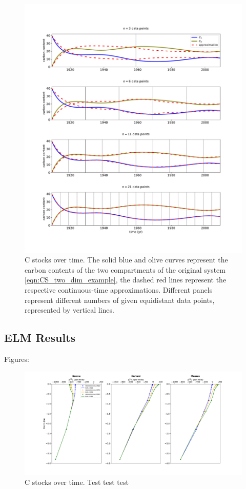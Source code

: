 \documentclass[11pt,a4paper]{article}
\begin{document}
    \begin{figure}[htbp]
        \centering 
        \includegraphics[width=1.0\linewidth]{figs/interpol_pwc_2.pdf}
        \caption{C stocks over time.
            The solid blue and olive curves represent the carbon contents of the two compartments of the original system \eqref{eqn:CS_two_dim_example}, the dashed red lines represent the respective continuous-time approximations.
            Different panels represent different numbers of given equidistant data points, represented by vertical lines.
            }
        \label{fig:CS_two_dim_example}
    \end{figure}        

\subsection{ELM Results}
Figures:

\begin{figure}[htbp]
        \centering 
        \includegraphics[width=1.0\linewidth]{figs/depth_profile_10.pdf}
        \caption{C stocks over time.
            Test test test 
            }
        \label{fig:test}
    \end{figure}      
\end{document}
